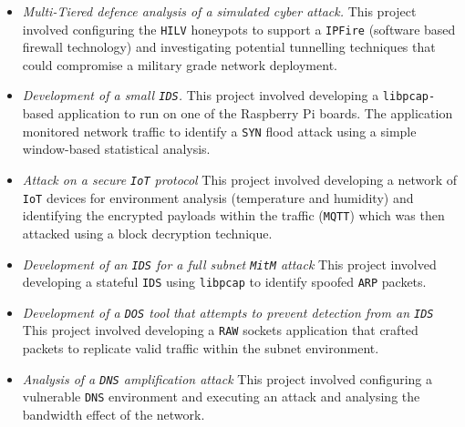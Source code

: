 \documentclass{ieeeaccess}
\begin{document}
\begin{itemize} 
  \item \noindent \emph{Multi-Tiered defence analysis of a simulated cyber
    attack.} This project involved configuring the \texttt{HILV} honeypots to
    support a \texttt{IPFire} (software based firewall technology) and
    investigating potential tunnelling techniques that could compromise a
    military grade network deployment.  
  \item \noindent \emph{Development of a small \texttt{IDS}.} This project
    involved developing a \texttt{libpcap-}based application to run on one of the
    Raspberry Pi boards. The application monitored network
    traffic to identify a \texttt{SYN} flood attack using a simple window-based
    statistical analysis.  
    \item \noindent \emph{Attack on a secure \texttt{IoT} protocol} This
      project involved developing a network of \texttt{IoT} devices for
      environment analysis (temperature and humidity) and identifying the
      encrypted payloads within the traffic (\texttt{MQTT}) which was then attacked using a block
      decryption technique.  
    \item \noindent \emph{Development of an \texttt{IDS} for a full subnet
      \texttt{MitM} attack} This project involved developing a stateful 
      \texttt{IDS} using \texttt{libpcap} to identify spoofed \texttt{ARP} packets.  
    \item \noindent \emph{Development of a \texttt{DOS} tool that attempts to
      prevent detection from an \texttt{IDS}} This project involved developing
      a \texttt{RAW} sockets application that crafted packets to
      replicate valid traffic within the subnet environment.  
     \item \noindent \emph{Analysis of a \texttt{DNS} amplification attack} This
       project involved configuring a vulnerable \texttt{DNS} environment and
       executing an attack and analysing the bandwidth effect of the network.
\end{itemize}
\end{document}
